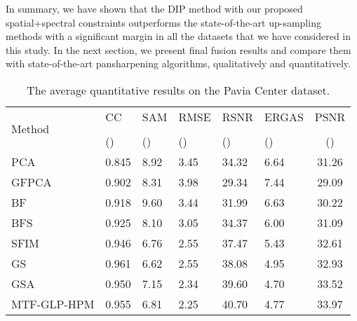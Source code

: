 \documentclass[journal]{IEEEtran}
\begin{document}
    In summary, we have shown that  the DIP method with our proposed spatial+spectral constraints outperforms the state-of-the-art up-sampling methods with a significant margin in all the datasets that we have considered in this study. In the next section, we present final fusion results and compare them with state-of-the-art pansharpening algorithms, qualitatively and quantitatively.
    
\begin{table}[tb]
        \centering
        \caption{The average quantitative results on the Pavia Center dataset.}
        \begin{tabular}{lp{0.5cm}p{0.5cm}p{0.6cm}p{0.5cm}p{0.6cm}c}
        \hline
        \multirow{3}{*}{Method}                          & CC                & SAM               & RMSE                  & RSNR              & ERGAS             & PSNR  \\
                                        &                   &                   &       &                   &                   & \\
                                        & ()      & ()    &  ()       & ()      & ()    & ()\\
        \hline
        PCA\cite{PCA1}                  & 0.845            & 8.92            & 3.45            & 34.32           & 6.64            & 31.26\\
        GFPCA \cite{GFPCA}              & 0.902            & 8.31            & 3.98            & 29.34           & 7.44            & 29.09\\
        BF \cite{BF}                    & 0.918            & 9.60            & 3.44            & 31.99           & 6.63            & 30.22\\
        BFS \cite{BFS}                  & 0.925            & 8.10            & 3.05            & 34.37           & 6.00            & 31.09\\
        SFIM \cite{SFIM}                & 0.946            & 6.76            & 2.55            & 37.47           & 5.43            & 32.61\\
        GS\cite{GS}                     & 0.961            & 6.62            & 2.55            & 38.08           & 4.95            & 32.93\\
        GSA\cite{GS}                    & 0.950            & 7.15            & 2.34            & 39.60           & 4.70            & 33.52\\
        MTF-GLP-HPM \cite{MTF-GLP-HPM}  & 0.955            & 6.81            & 2.25            & 40.70           & 4.77            & 33.97\\

\end{tabular}
\end{table}
\end{document}
